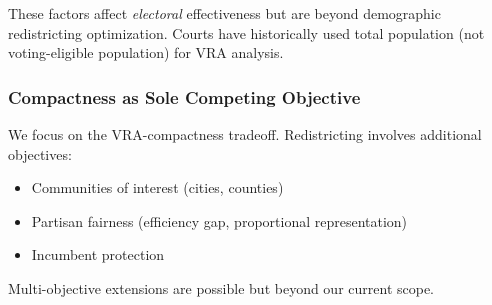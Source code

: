 These factors affect \emph{electoral} effectiveness but are beyond demographic redistricting optimization. Courts have historically used total population (not voting-eligible population) for VRA analysis.

\subsubsection{Compactness as Sole Competing Objective}

We focus on the VRA-compactness tradeoff. Redistricting involves additional objectives:
\begin{itemize}
    \item Communities of interest (cities, counties)
    \item Partisan fairness (efficiency gap, proportional representation)
    \item Incumbent protection
\end{itemize}

Multi-objective extensions are possible but beyond our current scope.
